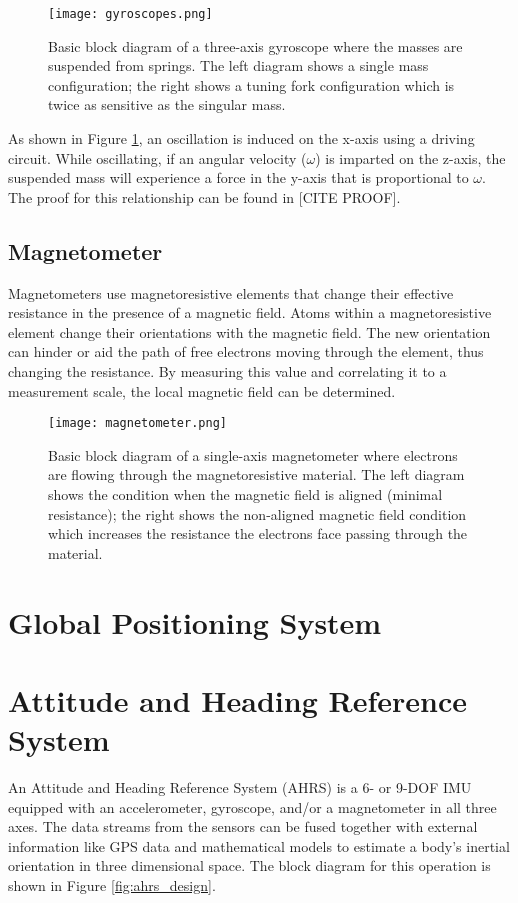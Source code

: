 \begin{figure}[h!]
    \caption[Gyroscope block diagram]{Basic block diagram of a three-axis gyroscope where the masses are suspended from springs. The left diagram shows a single mass configuration; the right shows a tuning fork configuration which is twice as sensitive as the singular mass.}
    \label{fig:gyroscopes}
    \centering
    \texttt{[image: gyroscopes.png]}
\end{figure}

As shown in Figure \ref{fig:gyroscopes}, an oscillation is induced on the x-axis using a driving circuit.
While oscillating, if an angular velocity ($\omega$) is imparted on the z-axis, the suspended mass will experience a force in the y-axis that is proportional to $\omega$.
The proof for this relationship can be found in [CITE PROOF].

\subsection{Magnetometer} \label{ssec:bkg_magnetometer}
Magnetometers use magnetoresistive elements that change their effective resistance in the presence of a magnetic field.
Atoms within a magnetoresistive element change their orientations with the magnetic field.
The new orientation can hinder or aid the path of free electrons moving through the element, thus changing the resistance.
By measuring this value and correlating it to a measurement scale, the local magnetic field can be determined.

\begin{figure}[h!]
    \caption[Magnetometer block diagram]{Basic block diagram of a single-axis magnetometer where electrons are flowing through the magnetoresistive material. The left diagram shows the condition when the magnetic field is aligned (minimal resistance); the right shows the non-aligned magnetic field condition which increases the resistance the electrons face passing through the material.}
    \label{fig:magnetometer}
    \centering
    \texttt{[image: magnetometer.png]}
\end{figure}

\section{Global Positioning System} \label{sec:bkg_gps}

\section{Attitude and Heading Reference System} \label{sec:bkg_ahrs}
An Attitude and Heading Reference System (AHRS) is a 6- or 9-DOF IMU equipped with an accelerometer, gyroscope, and/or a magnetometer in all three axes.
The data streams from the sensors can be fused together with external information like GPS data and mathematical models to estimate a body's inertial orientation in three dimensional space.
The block diagram for this operation is shown in Figure \ref{fig:ahrs_design}.

